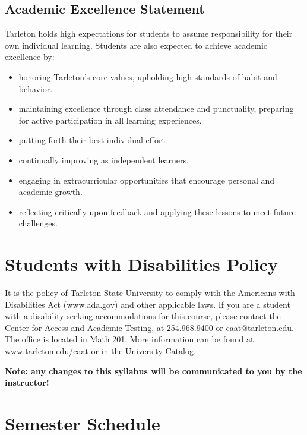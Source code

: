 \documentclass[10pt]{article}
\begin{document}
\subsection*{Academic Excellence Statement}
\label{sec:org04cfeb7}
Tarleton holds high expectations for students to assume responsibility for their own individual learning. Students are also expected to achieve academic excellence by:
\begin{itemize}
\item honoring Tarleton’s core values, upholding high standards of habit and behavior.
\item maintaining excellence through class attendance and punctuality, preparing for active participation in all learning experiences.
\item putting forth their best individual effort.
\item continually improving as independent learners.
\item engaging in extracurricular opportunities that encourage personal and academic growth.
\item reflecting critically upon feedback and applying these lessons to meet future challenges.
\end{itemize}

\section*{Students with Disabilities Policy}
\label{sec:org3270037}

It is the policy of Tarleton State University to comply with the Americans with Disabilities  Act (www.ada.gov) and other applicable laws.  If you are a student with a disability seeking accommodations for this course, please contact the Center for Access and Academic Testing, at 254.968.9400 or caat@tarleton.edu. The office is located in Math 201. More information can be found at www.tarleton.edu/caat or in the University Catalog.​

\textbf{Note:  any changes to this syllabus will be communicated to you by the instructor!}

\section*{Semester Schedule}
\label{sec:org9b4bc4f}
\end{document}
